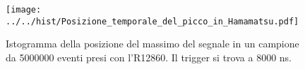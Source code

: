 \begin{figure}[h] \centering \texttt{[image: ../../hist/Posizione\_temporale\_del\_picco\_in\_Hamamatsu.pdf]}\caption{Istogramma della posizione del massimo del segnale in un campione da 5000000 eventi presi con l'R12860. Il trigger si trova a 8000 ns. }\label{hist:Posizione_temporale_del_picco_in_Hamamatsu} \end{figure}
